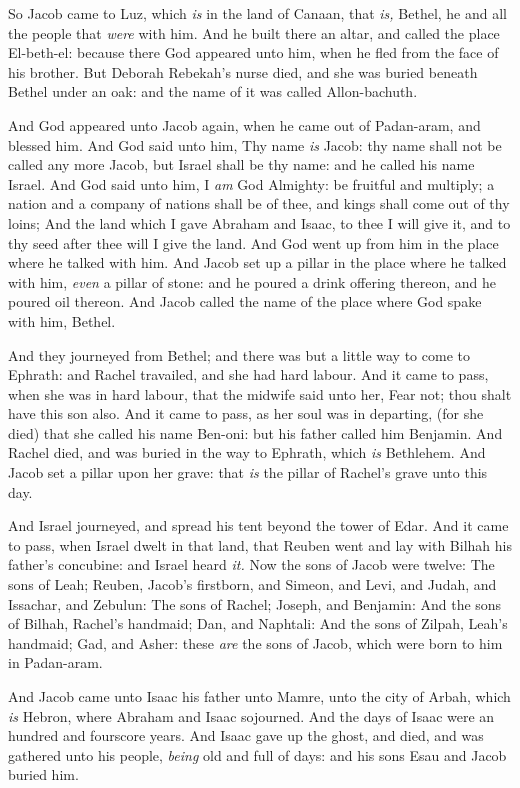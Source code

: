\documentclass[11pt,letterpaper,oneside]{memoir}
\begin{document}
So Jacob came to Luz, which \emph{is} in the land of Canaan, that
\emph{is,} Bethel, he and all the people that \emph{were} with him. And
he built there an altar, and called the place El-beth-el: because there
God appeared unto him, when he fled from the face of his brother. But
Deborah Rebekah's nurse died, and she was buried beneath Bethel under an
oak: and the name of it was called Allon-bachuth.

And God appeared unto Jacob again, when he came out of Padan-aram, and
blessed him. And God said unto him, Thy name \emph{is} Jacob: thy name
shall not be called any more Jacob, but Israel shall be thy name: and he
called his name Israel. And God said unto him, I \emph{am} God Almighty:
be fruitful and multiply; a nation and a company of nations shall be of
thee, and kings shall come out of thy loins; And the land which I gave
Abraham and Isaac, to thee I will give it, and to thy seed after thee
will I give the land. And God went up from him in the place where he
talked with him. And Jacob set up a pillar in the place where he talked
with him, \emph{even} a pillar of stone: and he poured a drink offering
thereon, and he poured oil thereon. And Jacob called the name of the
place where God spake with him, Bethel.

And they journeyed from Bethel; and there was but a little way to come
to Ephrath: and Rachel travailed, and she had hard labour. And it came
to pass, when she was in hard labour, that the midwife said unto her,
Fear not; thou shalt have this son also. And it came to pass, as her
soul was in departing, (for she died) that she called his name Ben-oni:
but his father called him Benjamin. And Rachel died, and was buried in
the way to Ephrath, which \emph{is} Bethlehem. And Jacob set a pillar
upon her grave: that \emph{is} the pillar of Rachel's grave unto this
day.

And Israel journeyed, and spread his tent beyond the tower of Edar. And
it came to pass, when Israel dwelt in that land, that Reuben went and
lay with Bilhah his father's concubine: and Israel heard \emph{it.} Now
the sons of Jacob were twelve: The sons of Leah; Reuben, Jacob's
firstborn, and Simeon, and Levi, and Judah, and Issachar, and Zebulun:
The sons of Rachel; Joseph, and Benjamin: And the sons of Bilhah,
Rachel's handmaid; Dan, and Naphtali: And the sons of Zilpah, Leah's
handmaid; Gad, and Asher: these \emph{are} the sons of Jacob, which were
born to him in Padan-aram.

And Jacob came unto Isaac his father unto Mamre, unto the city of Arbah,
which \emph{is} Hebron, where Abraham and Isaac sojourned. And the days
of Isaac were an hundred and fourscore years. And Isaac gave up the
ghost, and died, and was gathered unto his people, \emph{being} old and
full of days: and his sons Esau and Jacob buried him.
\end{document}
